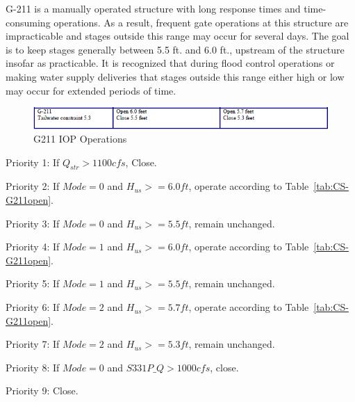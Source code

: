 G-211 is a manually operated structure with long response times and time-consuming operations.
As a result, frequent gate operations at this structure are impracticable and stages outside this range may occur for several days.
The goal is to keep stages generally between 5.5 ft. and 6.0 ft., upstream of the structure insofar as practicable.
It is recognized that during flood control operations or making water supply deliveries that stages outside this range either high or low may occur for extended periods of time.





\begin{figure}[!h]
  \begin{center}
  \includegraphics[width=6.5in]{../figs/G211_IOPops.png}
  \caption{G211 IOP Operations}
  \label{fig:G211iop}
  \end{center}
\end{figure}


\begin{packed_items}
\item Priority 1: If $Q_{str}>1100 cfs$, Close.
\item[]
\item Priority 2: If $Mode=0$ and $H_{us}>=6.0 ft$, operate according to Table~\ref{tab:CS-G211open}.
\item Priority 3: If $Mode=0$ and $H_{us}>=5.5 ft$, remain unchanged.
\item[]
\item Priority 4: If $Mode=1$ and $H_{us}>=6.0 ft$, operate according to Table~\ref{tab:CS-G211open}.
\item Priority 5: If $Mode=1$ and $H_{us}>=5.5 ft$, remain unchanged.
\item[]
\item Priority 6: If $Mode=2$ and $H_{us}>=5.7 ft$, operate according to Table~\ref{tab:CS-G211open}.
\item Priority 7: If $Mode=2$ and $H_{us}>=5.3 ft$, remain unchanged.
\item[]
\item Priority 8: \textcolor[rgb]{1.00,0.00,0.00}{If $Mode=0$ and $S331P\_Q>1000 cfs$, close.}
\item Priority 9: Close.
\end{packed_items}


